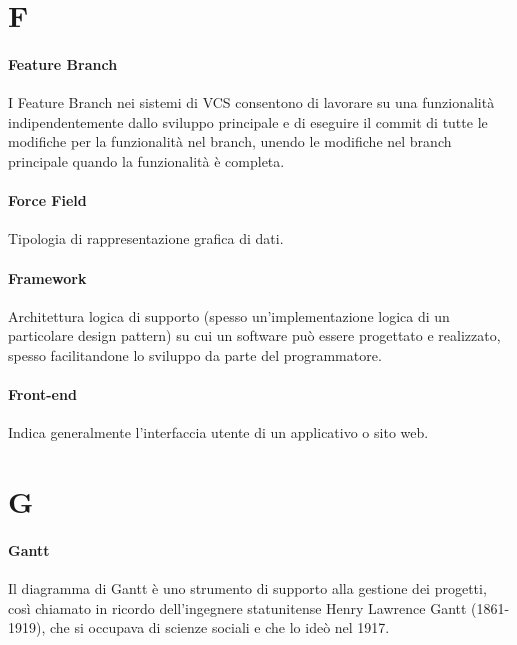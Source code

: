 \documentclass[]{article}
\begin{document}
	\newpage

	\section*{F}

	\paragraph*{Feature Branch}
	I Feature Branch nei sistemi di VCS consentono di lavorare su una funzionalità indipendentemente dallo sviluppo principale e di eseguire il commit di tutte le modifiche per la funzionalità nel branch, unendo le modifiche nel branch principale quando la funzionalità è completa.

	\paragraph*{Force Field}
	Tipologia di rappresentazione grafica di dati.

	\paragraph*{Framework}
	Architettura logica di supporto (spesso un'implementazione logica di un particolare design pattern) su cui un software può essere progettato e realizzato, spesso facilitandone lo sviluppo da parte del programmatore.

	\paragraph*{Front-end}
	Indica generalmente l'interfaccia utente di un applicativo o sito web.

	\newpage

	\section*{G}

	\paragraph*{Gantt}
	Il diagramma di Gantt è uno strumento di supporto alla gestione dei progetti, così chiamato in ricordo dell'ingegnere statunitense Henry Lawrence Gantt (1861-1919), che si occupava di scienze sociali e che lo ideò nel 1917.
\end{document}
